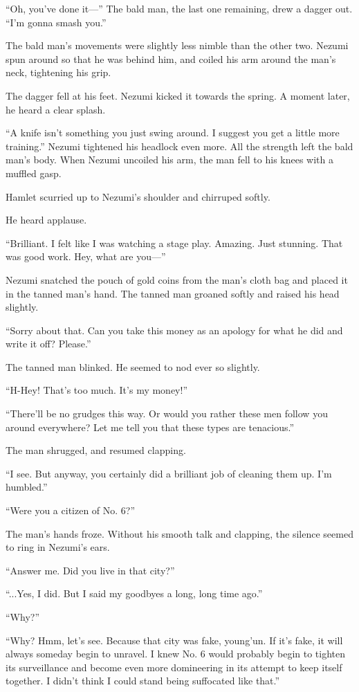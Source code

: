 ``Oh, you've done it---'' The bald man, the last one remaining, drew a
dagger out. ``I'm gonna smash you.''

The bald man's movements were slightly less nimble than the other two.
Nezumi spun around so that he was behind him, and coiled his arm around
the man's neck, tightening his grip.

The dagger fell at his feet. Nezumi kicked it towards the spring. A
moment later, he heard a clear splash.

``A knife isn't something you just swing around. I suggest you get a
little more training.'' Nezumi tightened his headlock even more. All the
strength left the bald man's body. When Nezumi uncoiled his arm, the man
fell to his knees with a muffled gasp.

Hamlet scurried up to Nezumi's shoulder and chirruped softly.

He heard applause.

``Brilliant. I felt like I was watching a stage play. Amazing. Just
stunning. That was good work. Hey, what are you---''

Nezumi snatched the pouch of gold coins from the man's cloth bag and
placed it in the tanned man's hand. The tanned man groaned softly and
raised his head slightly.

``Sorry about that. Can you take this money as an apology for what he
did and write it off? Please.''

The tanned man blinked. He seemed to nod ever so slightly.

``H-Hey! That's too much. It's my money!''

``There'll be no grudges this way. Or would you rather these men follow
you around everywhere? Let me tell you that these types are tenacious.''

The man shrugged, and resumed clapping.

``I see. But anyway, you certainly did a brilliant job of cleaning them
up. I'm humbled.''

``Were you a citizen of No. 6?''

The man's hands froze. Without his smooth talk and clapping, the silence
seemed to ring in Nezumi's ears.

``Answer me. Did you live in that city?''

``...Yes, I did. But I said my goodbyes a long, long time ago.''

``Why?''

``Why? Hmm, let's see. Because that city was fake, young'un. If it's
fake, it will always someday begin to unravel. I knew No. 6 would
probably begin to tighten its surveillance and become even more
domineering in its attempt to keep itself together. I didn't think I
could stand being suffocated like that.''

